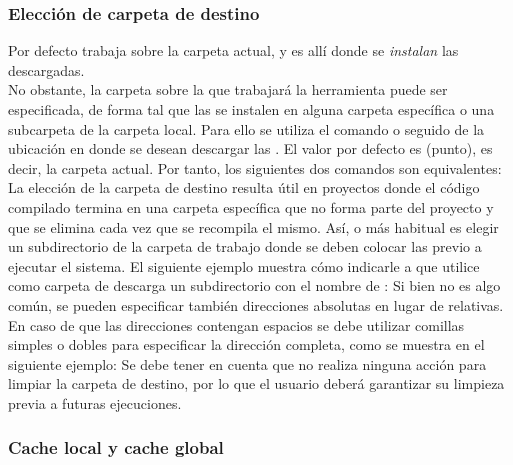 \subsubsection{Elección de carpeta de destino}
\label{subsubsec:guide:folder}

Por defecto \fronttier trabaja sobre la carpeta actual, y es allí donde se 
\emph{instalan} las \dependencies descargadas.\\
No obstante, la carpeta sobre la que trabajará la herramienta puede ser 
especificada, de forma tal que las \dependencies se instalen en alguna carpeta
específica o una subcarpeta de la carpeta local. Para ello se utiliza el  
comando  o  seguido de la ubicación en donde 
se desean descargar las \dependencies.
El valor por defecto es  (punto), es decir, la carpeta actual. Por 
tanto, los siguientes dos comandos son equivalentes:
La elección de la carpeta de destino resulta útil en proyectos donde el código 
compilado termina en una carpeta específica que no forma parte del proyecto y 
que se elimina cada vez que se recompila el mismo. Así, o más habitual es 
elegir  un subdirectorio de la carpeta de trabajo donde se deben colocar las 
\dependencies previo a ejecutar el sistema. El siguiente ejemplo muestra cómo 
indicarle a \fronttier que utilice como carpeta de descarga un subdirectorio 
con el nombre de :
Si bien no es algo común, se pueden especificar también direcciones absolutas 
en lugar de relativas. En caso de que las direcciones contengan espacios se 
debe utilizar comillas simples o dobles para especificar la dirección completa, 
como se muestra en el siguiente ejemplo:
Se debe tener en cuenta que \fronttier no realiza ninguna acción para limpiar 
la carpeta de destino, por lo que el usuario deberá garantizar su limpieza 
previa a futuras ejecuciones.

\subsubsection{Cache local y cache global}
\label{subsubsec:guide:localmode}

